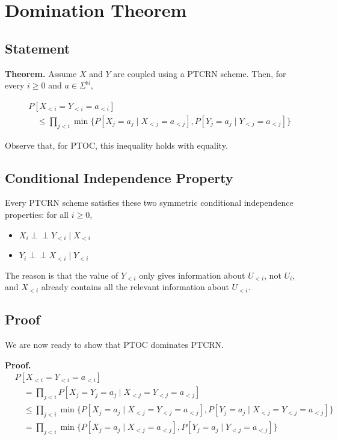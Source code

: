 \documentclass{article}
\newcommand{\N}{\mathbb{N}}
\newcommand{\perpci}{\perp\!\!\!\perp}
\begin{document}
\section*{Domination Theorem}

\subsection*{Statement}

\textbf{Theorem.} Assume $X$ and $Y$ are coupled using a PTCRN scheme. Then, for every $i \geq 0$ and $a \in \Sigma^\N$,

\begin{equation}
\begin{split}
&P[X_{<i} = Y_{<i} = a_{<i}] \\
&\quad\leq \prod_{j < i} \min \{ P[X_j = a_j \mid X_{<j} = a_{<j}], P[Y_j = a_j \mid Y_{<j} = a_{<j}] \}
\end{split}
\end{equation}

Observe that, for PTOC, this inequality holds with equality.

\subsection*{Conditional Independence Property}

Every PTCRN scheme satisfies these two symmetric conditional independence properties: for all $i \geq 0$,

\begin{itemize}
    \item $X_i \perpci Y_{<i} \mid X_{<i}$
    \item $Y_i \perpci X_{<i} \mid Y_{<i}$
\end{itemize}

The reason is that the value of $Y_{<i}$ only gives information about $U_{<i}$, not $U_i$, and $X_{<i}$ already contains all the relevant information about $U_{<i}$.

\subsection*{Proof}

We are now ready to show that PTOC dominates PTCRN.

\textbf{Proof.}
\begin{align*}
&P[X_{<i} = Y_{<i} = a_{<i}] \\
&\quad= \prod_{j < i} P[X_j = Y_j = a_j \mid X_{<j} = Y_{<j} = a_{<j}] \\
&\quad\leq \prod_{j < i} \min \{ P[X_j = a_j \mid X_{<j} = Y_{<j} = a_{<j}], P[Y_j = a_j \mid X_{<j} = Y_{<j} = a_{<j}] \} \\
&\quad= \prod_{j < i} \min \{ P[X_j = a_j \mid X_{<j} = a_{<j}], P[Y_j = a_j \mid Y_{<j} = a_{<j}] \}
\end{align*}
\end{document}

